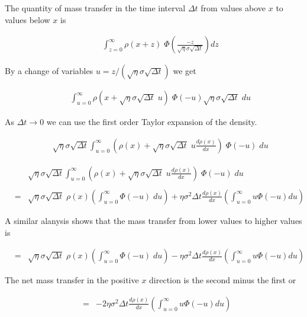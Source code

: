 {{The quantity of mass transfer in the time interval $\Delta t$ from values above $x$ to values below $x$ is


\begin{eqnarray*}
&  & \int_{z = 0}^\infty \rho(x+z)\;\Phi\left(\frac{-z}{\sqrt{\eta}\sigma\sqrt{\Delta t}}\right) dz
\end{eqnarray*}

By a change of variables $u = z/(\sqrt{\eta}\sigma\sqrt{\Delta t})$ we get

\begin{eqnarray*}
&  & \int_{u = 0}^\infty \rho(x+\sqrt{\eta}\sigma\sqrt{\Delta t}\;u)\;\Phi(-u) \sqrt{\eta}\sigma\sqrt{\Delta t}\;du
\end{eqnarray*}

\vfill
As $\Delta t \rightarrow 0$ we can use the first order Taylor expansion of the density.

\begin{eqnarray*}
&  & \sqrt{\eta}\sigma\sqrt{\Delta t} \int_{u = 0}^\infty \left(\rho(x)+\sqrt{\eta}\sigma\sqrt{\Delta t}\;u \frac{d\rho(x)}{dx}\right)\;\Phi(-u)\;du
\end{eqnarray*}
}

{\Large

\begin{eqnarray*}
&  & \sqrt{\eta}\sigma\sqrt{\Delta t} \int_{u = 0}^\infty \left(\rho(x)+\sqrt{\eta}\sigma\sqrt{\Delta t}\;u \frac{d\rho(x)}{dx}\right)\;\Phi(-u)\;du \\
\\
& = & \sqrt{\eta}\sigma\sqrt{\Delta t}\;\rho(x)\left(\int_{u=0}^\infty \Phi(-u)\;du\right) +  \eta\sigma^2\Delta t \frac{d\rho(x)}{dx} \left(\int_{u=0}^\infty u\Phi(-u) du\right)
\end{eqnarray*}

A similar alanysis shows that the mass transfer from lower values to higher values is

\begin{eqnarray*}
& = & \sqrt{\eta}\sigma\sqrt{\Delta t}\;\rho(x)\left(\int_{u=0}^\infty \Phi(-u)\;du\right) -  \eta\sigma^2\Delta t \frac{d\rho(x)}{dx} \left(\int_{u=0}^\infty u\Phi(-u) du\right)
\end{eqnarray*}

\vfill
The net mass transfer in the positive $x$ direction is the second minus the first or

\begin{eqnarray*}
& = & - 2\eta\sigma^2\Delta t \frac{d\rho(x)}{dx} \left(\int_{u=0}^\infty u\Phi(-u) du\right)
\end{eqnarray*}
}

}

